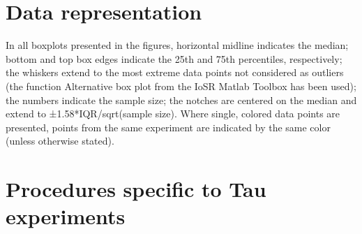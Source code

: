 \section{Data representation}
In all boxplots presented in the figures, horizontal midline indicates the median; bottom and top box edges indicate the 25th and 75th percentiles, respectively; the whiskers extend to the most extreme data points not considered as outliers (the function Alternative box plot from the IoSR Matlab Toolbox has been used); the numbers indicate the sample size; the notches are centered on the median and extend to ±1.58*IQR/sqrt(sample size). Where single, colored data points are presented, points from the same experiment are indicated by the same color (unless otherwise stated). 

\section{Procedures specific to Tau experiments}
